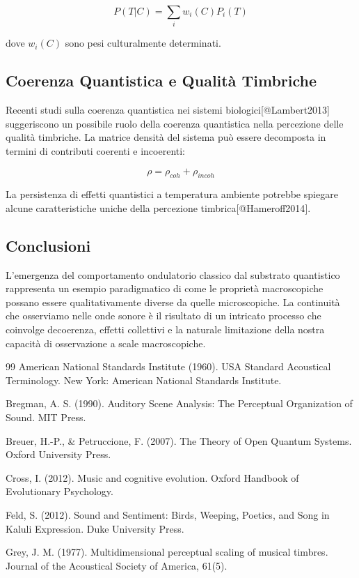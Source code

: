 \documentclass[a4paper,11pt]{article}
\begin{document}
\[P(T|C) = \sum_i w_i(C)P_i(T)\]

dove \(w_i(C)\) sono pesi culturalmente determinati.

\subsection{Coerenza Quantistica e Qualità
Timbriche}\label{coerenza-quantistica-e-qualituxe0-timbriche}

Recenti studi sulla coerenza quantistica nei sistemi
biologici{[}@Lambert2013{]} suggeriscono un possibile ruolo della
coerenza quantistica nella percezione delle qualità timbriche. La
matrice densità del sistema può essere decomposta in termini di
contributi coerenti e incoerenti:

\[\rho = \rho_{coh} + \rho_{incoh}\]

La persistenza di effetti quantistici a temperatura ambiente potrebbe
spiegare alcune caratteristiche uniche della percezione
timbrica{[}@Hameroff2014{]}.

\subsection{Conclusioni}\label{conclusioni}

L'emergenza del comportamento ondulatorio classico dal substrato
quantistico rappresenta un esempio paradigmatico di come le proprietà
macroscopiche possano essere qualitativamente diverse da quelle
microscopiche. La continuità che osserviamo nelle onde sonore è il
risultato di un intricato processo che coinvolge decoerenza, effetti
collettivi e la naturale limitazione della nostra capacità di
osservazione a scale macroscopiche.

99 American National Standards Institute (1960). USA Standard Acoustical
Terminology. New York: American National Standards Institute.

Bregman, A. S. (1990). Auditory Scene Analysis: The Perceptual
Organization of Sound. MIT Press.

Breuer, H.-P., \& Petruccione, F. (2007). The Theory of Open Quantum
Systems. Oxford University Press.

Cross, I. (2012). Music and cognitive evolution. Oxford Handbook of
Evolutionary Psychology.

Feld, S. (2012). Sound and Sentiment: Birds, Weeping, Poetics, and Song
in Kaluli Expression. Duke University Press.

Grey, J. M. (1977). Multidimensional perceptual scaling of musical
timbres. Journal of the Acoustical Society of America, 61(5).
\end{document}
